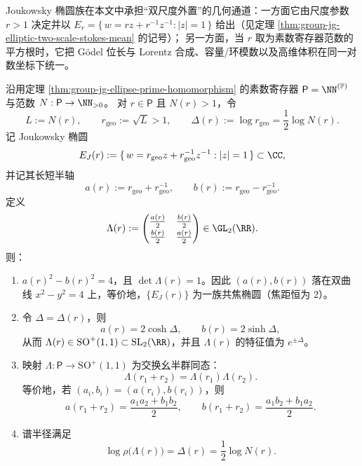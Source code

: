 Joukowsky 椭圆族在本文中承担“双尺度外置”的几何通道：一方面它由尺度参数 \(r>1\) 决定并以
\(
E_r=\{\,w=r z+r^{-1}z^{-1}:|z|=1\,\}
\)
给出（见定理 \ref{thm:group-jg-elliptic-two-scale-stokes-mean} 的记号）；
另一方面，当 \(r\) 取为素数寄存器范数的平方根时，它把 Gödel 位长与 Lorentz 合成、容量/环模数以及高维体积在同一对数坐标下统一。

\begin{theorem}\label{thm:group-jg-godel-lorentz-algebraization}
沿用定理 \ref{thm:group-jg-ellipse-prime-homomorphism} 的素数寄存器 \(\mathsf P=\NN^{(\mathbb P)}\) 与范数 \(N:\mathsf P\to\NN_{>0}\)。
对 \(r\in\mathsf P\) 且 \(N(r)>1\)，令
\[
L:=N(r),\qquad r_{\mathrm{geo}}:=\sqrt{L}>1,\qquad
\Delta(r):=\log r_{\mathrm{geo}}=\frac12\log N(r).
\]
记 Joukowsky 椭圆
\[
E_J(r):=\{\,w=r_{\mathrm{geo}} z+r_{\mathrm{geo}}^{-1}z^{-1}:|z|=1\,\}\subset\CC,
\]
并记其长短半轴
\[
a(r):=r_{\mathrm{geo}}+r_{\mathrm{geo}}^{-1},\qquad b(r):=r_{\mathrm{geo}}-r_{\mathrm{geo}}^{-1}.
\]
定义
\[
\Lambda(r):=
\begin{pmatrix}
\frac{a(r)}{2} & \frac{b(r)}{2}\\[2pt]
\frac{b(r)}{2} & \frac{a(r)}{2}
\end{pmatrix}\in\GL_2(\RR).
\]
则：
\begin{enumerate}
  \item \(a(r)^2-b(r)^2=4\)，且 \(\det\Lambda(r)=1\)。因此 \((a(r),b(r))\) 落在双曲线 \(x^2-y^2=4\) 上，等价地，\(\{E_J(r)\}\) 为一族共焦椭圆（焦距恒为 \(2\)）。
  \item 令 \(\Delta=\Delta(r)\)，则
  \[
  a(r)=2\cosh\Delta,\qquad b(r)=2\sinh\Delta,
  \]
  从而 \(\Lambda(r)\in\mathrm{SO}^+(1,1)\subset \mathrm{SL}_2(\RR)\)，并且 \(\Lambda(r)\) 的特征值为 \(e^{\pm\Delta}\)。
  \item 映射 \(\Lambda:\mathsf P\to \mathrm{SO}^+(1,1)\) 为交换幺半群同态：
  \[
  \Lambda(r_1+r_2)=\Lambda(r_1)\Lambda(r_2).
  \]
  等价地，若 \((a_i,b_i)=(a(r_i),b(r_i))\)，则
  \[
  a(r_1+r_2)=\frac{a_1a_2+b_1b_2}{2},\qquad
  b(r_1+r_2)=\frac{a_1b_2+b_1a_2}{2}.
  \]
  \item 谱半径满足
  \[
  \log \rho\bigl(\Lambda(r)\bigr)=\Delta(r)=\frac12\log N(r).
  \]
\end{enumerate}
\end{theorem}

